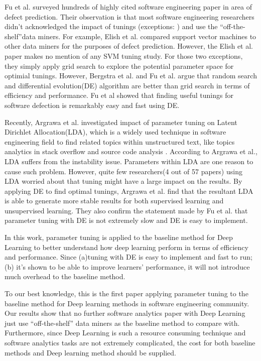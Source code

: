 \documentclass[sigconf,review, anonymous]{acmart}
\theoremstyle{break}
\begin{document}
Fu et al.\cite{fu2016tuning} surveyed hundreds of highly 
cited software engineering paper in area of defect prediction. 
Their observation is that most software engineering  researchers
didn't acknowledged the impact of tunings 
(exceptions: \cite{lessmann2008benchmarking,tantithamthavorn2016automated}) and
use the ``off-the-shelf''data miners. For example, 
Elish et al.\cite{elish2008predicting} compared support vector machines
to other data miners for the purposes of defect prediction.
However, the Elish et al. paper makes no mention of any SVM tuning study.
For those two exceptions\cite{lessmann2008benchmarking,tantithamthavorn2016automated}, 
they simply apply grid search to explore the potential parameter space for optimial tunings.
However, Bergstra et al.\cite{bergstra2012random} and 
Fu et al.\cite{fu2016differential} argue that random search and 
differential evolution(DE) algorithm are better than 
grid search in terms of efficiency and performance.
Fu et al showed that finding useful tunings for software defection is remarkably easy and fast using DE.

Recently, Argrawa et al.\cite{agrawal2016wrong} investigated 
impact of parameter tuning on Latent Dirichlet Allocation(LDA),
which is a widely used technique in software engineering field
to find related topics within unstructured text, 
like topics analytics in stack overflow \cite{barua2014developers}
and source code analysis \cite{binkley2014understanding}.
According to Argrawa et al., LDA suffers from the instability issue.
Parameters within LDA are one reason to cause such problem. However,
quite few researchers(4 out of 57 papers) using LDA worried about
that tuning might have a large impact on the results. By applying DE to find 
optimal tunings,  Argrawa et al. find that the resultant LDA is able to generate more stable results
for both supervised learning and unsupervised learning.
They also confirm the statement made by Fu et al.\cite{fu2016tuning} that
parameter tuning with DE is not extremely slow and DE is easy to implement.

In this work, parameter tuning is applied to the baseline method for Deep Learning
to better understand how deep learning perform in terms of efficiency and performance.
Since (a)tuning with DE is easy to implement and fast to run; (b) it's shown to be able
to improve learners' performance, it will not introduce much overhead to the baseline method.

To our best knowledge, this is the first paper
applying parameter tuning to the baseline method for Deep learning methods in 
software engineering community. Our results show that no further software analytics
paper with Deep Learning just use ``off-the-shelf'' data miners as the baseline
method to compare with. Furthermore, since Deep Learning is such a resource consuming
technique and software analytics tasks are not extremely complicated, the cost for 
both baseline methods and Deep learning method should be supplied.
\end{document}
